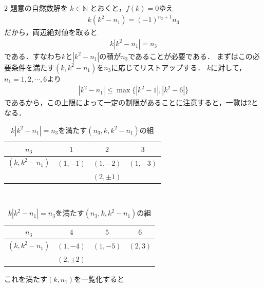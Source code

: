 \documentclass[../../main.tex]{subfiles}
\begin{document}
\begin{multicols}{2}
  題意の自然数解を $k\in\mathbb{N}$ とおくと，$f(k)=0$ゆえ
  \begin{align}
    k(k^2 - n_1) = (-1)^{n_2+1} n_3
  \end{align}
  だから，両辺絶対値を取ると
  \begin{align}
    k \left|k^2 - n_1\right| = n_3
  \end{align}
  である．すなわち$k$と$|k^2-n_1|$の積が$n_3$であることが必要である．
  まずはこの必要条件を満たす$(k,k^2-n_1)$を$n_3$に応じてリストアップする．
  $k$に対して，$n_1=1,2,\cdots,6$より
  \begin{align}
    |k^2-n_1| \le \max\{|k^2-1|, |k^2-6|\}
  \end{align}
  であるから，この上限によって一定の制限があることに注意すると，一覧は\cref{2007-1:table:3}となる．

  \begin{table}[H]
    \centering
    \caption{$k|k^2-n_1|=n_3$を満たす$(n_3,k,k^2-n_1)$の組}
    \label{2007-1:table:3}
    \begin{tabular}{|c||c|c|c|}
      \hline
      $n_3$         & $1$      & $2$         & $3$      \\
      \hline
      $(k,k^2-n_1)$ & $(1,-1)$ & $(1,-2)$    & $(1,-3)$ \\
      &          & $(2,\pm 1)$ &          \\
      \hline
    \end{tabular} \\

    \begin{tabular}{|c||c|c|c|}
      \hline
      $n_3$         & $4$         & $5$      & $6$     \\
      \hline
      $(k,k^2-n_1)$ & $(1,-4)$    & $(1,-5)$ & $(2,3)$ \\
      & $(2,\pm 2)$ &          &         \\
      \hline
    \end{tabular}
  \end{table}
  これを満たす$(k,n_1)$を一覧化すると


\end{multicols}
\end{document}
